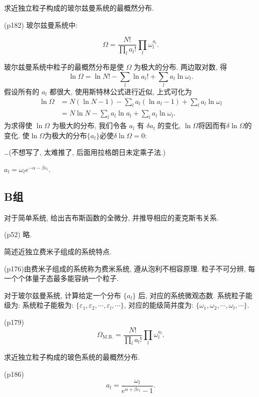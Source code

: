 \begin{questions}
  \question 求近独立粒子构成的玻尔兹曼系统的最概然分布.
  \begin{solution}
    (p182) 玻尔兹曼系统中:

    \begin{equation}
      \label{eq:5}
      \Omega = \frac{N!}{\prod_l a_l !} \prod_l \omega_l^{a_l}.
    \end{equation}

    玻尔兹曼系统中粒子的最概然分布是使 $\Omega$ 为极大的分布. 两边取对数, 得
    \begin{equation}
      \label{eq:6}
      \ln \Omega = \ln N! - \sum_l\ln a_l! + \sum_l a_l \ln \omega_l.
    \end{equation}
    假设所有的 $a_l$ 都很大, 使用斯特林公式进行近似, 上式可化为
    \begin{align}
      \label{eq:7}
      \ln\Omega & = N(\ln N - 1) - \sum_l a_l(\ln a_l - 1) + \sum_l a_l \ln\omega_l \\
                & = N\ln N - \sum_l a_l \ln a_l + \sum_l a_l \ln \omega_l.
    \end{align}
为求得使 $\ln\Omega$ 为极大的分布, 我们令各 $a_l$ 有 $\delta a_l$ 的变化, $\ln\varOmega$将因而有$\delta\ln\varOmega$的变化. 使$\ln\varOmega$为极大的分布$\{a_l\}$必使$\delta\ln\varOmega=0$:

\dots(不想写了, 太难推了, 后面用拉格朗日未定乘子法.)

$a_l = \omega_le^{-\alpha-\beta\varepsilon_l}$.


  \end{solution}
\end{questions}

\subsection{B组}
\begin{questions}
  \question 对于简单系统, 给出吉布斯函数的全微分, 并推导相应的麦克斯韦关系.
\begin{solution}
  (p52) 略.
\end{solution}
  \question 简述近独立费米子组成的系统特点.
\begin{solution}
  (p176)由费米子组成的系统称为费米系统, 遵从泡利不相容原理. 粒子不可分辨, 每一个个体量子态最多能容纳一个粒子.
\end{solution}
\question 对于玻尔兹曼系统, 计算给定一个分布 $ \{a_l \}$ 后, 对应的系统微观态数. 系统粒子能级为: 系统粒子能极为: $\{\varepsilon_1, \varepsilon_2, \cdots, \varepsilon_l, \cdots\}$, 对应的能级简并度为: $ \{ \omega_1, \omega_2, \cdots,\allowbreak \omega_l, \cdots  \}$.
\begin{solution}
  (p179)
  \begin{equation}
    \varOmega_{\text{M.B.}} = \frac{N!}{\prod_l a_l !}\prod_l \omega_l^{a_l}.
  \end{equation}
\end{solution}
  \question 求近独立粒子构成的玻色系统的最概然分布.
\begin{solution}
  (p186)
  \begin{equation}
    a_l = \frac{\omega_l}{e^{\alpha+\beta\varepsilon_l}-1}.
  \end{equation}
\end{solution}
\end{questions}
